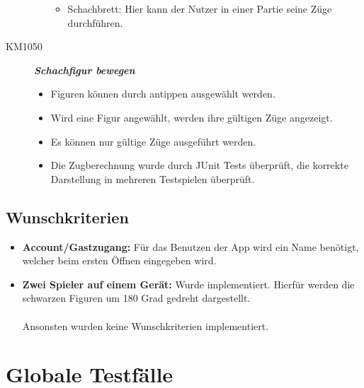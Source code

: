 \documentclass[parskip=full]{scrartcl}
\begin{document}
\begin{description}
\begin{itemize}
\begin{itemize}
			\item Schachbrett: Hier kann der Nutzer in einer Partie seine Züge durchführen.
			
		\end{itemize}
	\end{itemize}
	\item[KM1050] \textbf{\textit{Schachfigur bewegen}}
	\begin{itemize}
		\item Figuren können durch antippen ausgewählt werden.
		\item Wird eine Figur angewählt, werden ihre gültigen Züge angezeigt.
		\item Es können nur gültige Züge ausgeführt werden.
		\item Die Zugberechnung wurde durch JUnit Tests überprüft, die korrekte Darstellung in mehreren Testspielen überprüft.
	\end{itemize}
\end{description}
\subsection{Wunschkriterien}
\begin{itemize}
\item{\textbf{Account/Gastzugang:}} Für das Benutzen der App wird ein Name benötigt, welcher beim ersten Öffnen eingegeben wird. 
\item{\textbf{Zwei Spieler auf einem Gerät:}} Wurde implementiert. Hierfür werden die schwarzen Figuren um 180 Grad gedreht dargestellt. \\
\\
Ansonsten wurden keine Wunschkriterien implementiert.
\end{itemize}
\section{Globale Testfälle}
\end{document}
